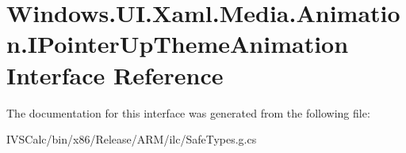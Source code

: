 \hypertarget{interface_windows_1_1_u_i_1_1_xaml_1_1_media_1_1_animation_1_1_i_pointer_up_theme_animation}{}\section{Windows.\+U\+I.\+Xaml.\+Media.\+Animation.\+I\+Pointer\+Up\+Theme\+Animation Interface Reference}
\label{interface_windows_1_1_u_i_1_1_xaml_1_1_media_1_1_animation_1_1_i_pointer_up_theme_animation}


The documentation for this interface was generated from the following file\+:\begin{DoxyCompactItemize}
\item 
I\+V\+S\+Calc/bin/x86/\+Release/\+A\+R\+M/ilc/Safe\+Types.\+g.\+cs\end{DoxyCompactItemize}
